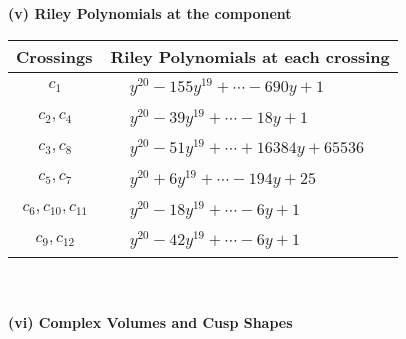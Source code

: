 \documentclass[1p]{elsarticle_modified}
\theoremstyle{definition}
\begin{document}
\newpage\renewcommand{\arraystretch}{1}
\flushleft \textbf{(v) Riley Polynomials at the component}\newline \\
\begin{tabular}{m{50pt}|m{274pt}}
Crossings & \hspace{64pt}Riley Polynomials at each crossing \\
\hline $$\begin{aligned}c_{1}\end{aligned}$$&$\begin{aligned}
&y^{20}-155 y^{19}+\cdots-690 y+1
\end{aligned}$\\
\hline $$\begin{aligned}c_{2},c_{4}\end{aligned}$$&$\begin{aligned}
&y^{20}-39 y^{19}+\cdots-18 y+1
\end{aligned}$\\
\hline $$\begin{aligned}c_{3},c_{8}\end{aligned}$$&$\begin{aligned}
&y^{20}-51 y^{19}+\cdots+16384 y+65536
\end{aligned}$\\
\hline $$\begin{aligned}c_{5},c_{7}\end{aligned}$$&$\begin{aligned}
&y^{20}+6 y^{19}+\cdots-194 y+25
\end{aligned}$\\
\hline $$\begin{aligned}c_{6},c_{10},c_{11}\end{aligned}$$&$\begin{aligned}
&y^{20}-18 y^{19}+\cdots-6 y+1
\end{aligned}$\\
\hline $$\begin{aligned}c_{9},c_{12}\end{aligned}$$&$\begin{aligned}
&y^{20}-42 y^{19}+\cdots-6 y+1
\end{aligned}$\\
\hline
\end{tabular}\\~\\
\newpage\flushleft \textbf{(vi) Complex Volumes and Cusp Shapes}
\end{document}
